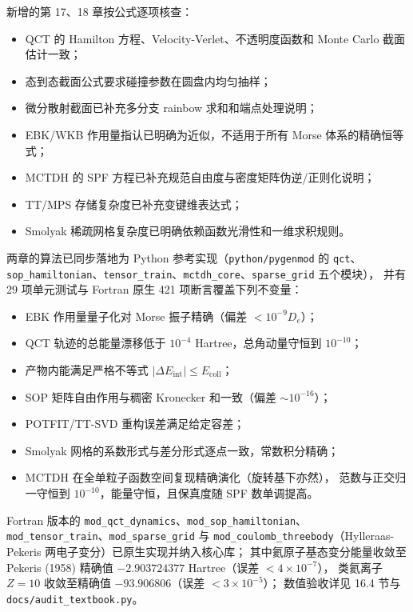 \documentclass[
]{ctexbook}
\providecommand{\tightlist}{%
  \setlength{\itemsep}{0pt}\setlength{\parskip}{0pt}}
\begin{document}
新增的第 17、18 章按公式逐项核查：

\begin{itemize}
\tightlist
\item
  QCT 的 Hamilton 方程、Velocity-Verlet、不透明度函数和 Monte Carlo
  截面估计一致；
\item
  态到态截面公式要求碰撞参数在圆盘内均匀抽样；
\item
  微分散射截面已补充多分支 rainbow 求和和端点处理说明；
\item
  EBK/WKB 作用量指认已明确为近似，不适用于所有 Morse 体系的精确恒等式；
\item
  MCTDH 的 SPF 方程已补充规范自由度与密度矩阵伪逆/正则化说明；
\item
  TT/MPS 存储复杂度已补充变键维表达式；
\item
  Smolyak 稀疏网格复杂度已明确依赖函数光滑性和一维求积规则。
\end{itemize}

两章的算法已同步落地为 Python 参考实现（\texttt{python/pygenmod} 的
\texttt{qct}、
\texttt{sop\_hamiltonian}、\texttt{tensor\_train}、\texttt{mctdh\_core}、\texttt{sparse\_grid}
五个模块）， 并有 29 项单元测试与 Fortran 原生 421
项断言覆盖下列不变量：

\begin{itemize}
\tightlist
\item
  EBK 作用量量子化对 Morse 振子精确（偏差 \(<10^{-9}D_e\)）；
\item
  QCT 轨迹的总能量漂移低于 \(10^{-4}\) Hartree，总角动量守恒到
  \(10^{-10}\)；
\item
  产物内能满足严格不等式
  \(|\Delta E_{\mathrm{int}}|\le E_{\mathrm{coll}}\)；
\item
  SOP 矩阵自由作用与稠密 Kronecker 和一致（偏差 \(\sim10^{-16}\)）；
\item
  POTFIT/TT-SVD 重构误差满足给定容差；
\item
  Smolyak 网格的系数形式与差分形式逐点一致，常数积分精确；
\item
  MCTDH 在全单粒子函数空间复现精确演化（旋转基下亦然），
  范数与正交归一守恒到 \(10^{-10}\)，能量守恒，且保真度随 SPF
  数单调提高。
\end{itemize}

Fortran 版本的
\texttt{mod\_qct\_dynamics}、\texttt{mod\_sop\_hamiltonian}、\texttt{mod\_tensor\_train}、\texttt{mod\_sparse\_grid}
与 \texttt{mod\_coulomb\_threebody}（Hylleraas-Pekeris
两电子变分）已原生实现并纳入核心库； 其中氦原子基态变分能量收敛至
Pekeris (1958) 精确值 \(-2.903724377\) Hartree（误差
\(<4\times10^{-7}\)）， 类氦离子 \(Z=10\) 收敛至精确值
\(-93.906806\)（误差 \(<3\times10^{-5}\)）； 数值验收详见 16.4 节与
\texttt{docs/audit\_textbook.py}。
\end{document}
